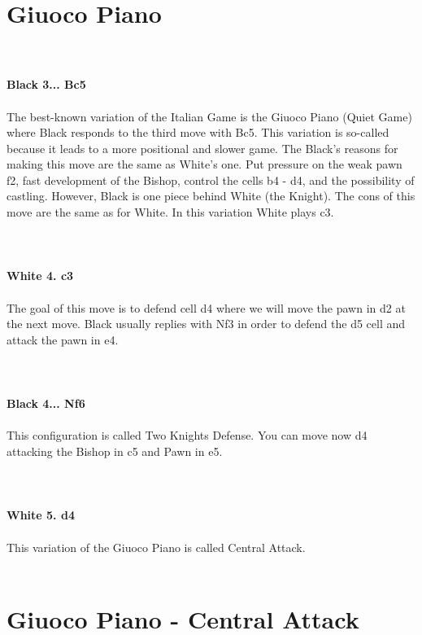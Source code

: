 \documentclass{article}
\begin{document}
\section{ Giuoco Piano}


\\
\\
\textbf{Black 3... Bc5}\\
\\
The best-known variation of the Italian Game is the Giuoco Piano (Quiet Game) where Black responds to the third move with Bc5. This variation is so-called because it leads to a more positional and slower game. The Black's reasons for making this move are the same as White's one. Put pressure on the weak pawn f2, fast development of the Bishop, control the cells b4 - d4, and the possibility of castling. However, Black is one piece behind White (the Knight). The cons of this move are the same as for White. In this variation White plays c3.\\
\\

\\
\\
\textbf{White 4. c3}\\
\\
The goal of this move is to defend cell d4 where we will move the pawn in d2 at the next move. Black usually replies with Nf3 in order to defend the d5 cell and attack the pawn in e4.\\
\\

\\
\\
\textbf{Black 4... Nf6}\\
\\
This configuration is called Two Knights Defense. You can move now d4 attacking the Bishop in c5 and Pawn in e5.\\
\\

\\
\\
\textbf{White 5. d4}\\
\\
This variation of the Giuoco Piano is called Central Attack.\\
\\
\section{ Giuoco Piano - Central Attack}
\end{document}

